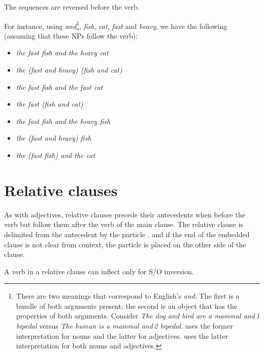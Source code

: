 \documentclass{book}
\begin{document}
The sequences are reversed before the verb.

For instance, using  \emph{and}\footnote{There are two meanings that correspond to English's \emph{and}. The first is a bundle of both arguments present; the second is an object that has the properties of both arguments. Consider \emph{The dog and bird are a mammal and\,1 bipedal} versus \emph{The human is a mammal and\,2 bipedal}.  uses the former interpretation for nouns and the latter for adjectives.  uses the latter interpretation for both nouns and adjectives.},  \emph{fish},  \emph{cat},  \emph{fast} and  \emph{heavy}, we have the following (assuming that these NPs follow the verb):

\begin{itemize}
  \item {} \emph{the fast fish and the heavy cat}
  \item {} \emph{the (fast and heavy) (fish and cat)}
  \item {} \emph{the fast fish and the fast cat}
  \item {} \emph{the fast (fish and cat)}
  \item {} \emph{the fast fish and the heavy fish}
  \item {} \emph{the (fast and heavy) fish}
  \item {} \emph{the (fast fish) and the cat}
\end{itemize}

\section{Relative clauses}

As with adjectives, relative clauses precede their antecedents when before the verb but follow them after the verb of the main clause. The relative clause is delimited from the antecedent by the particle , and if the end of the embedded clause is not clear from context, the particle  is placed on the other side of the clause.

A verb in a relative clause can inflect only for S/O inversion.
\end{document}
